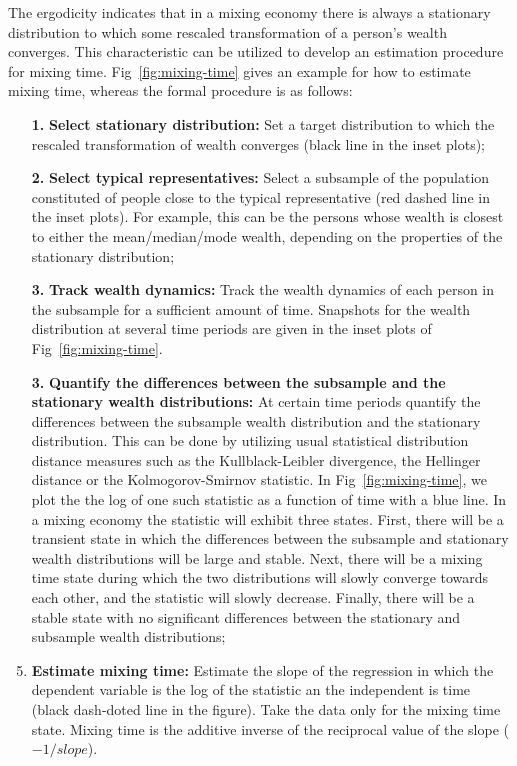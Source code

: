 \documentclass[11pt]{article}
\numberwithin{equation}{section}
\begin{document}
The ergodicity indicates that in a mixing economy there is always a stationary distribution to which some rescaled transformation of a person's wealth converges. This characteristic can be utilized to develop an estimation procedure for mixing time. Fig~\ref{fig:mixing-time} gives an example for how to estimate mixing time, whereas the formal procedure is as follows:
\begin{enumerate}
    \item[\textbf{1.}] \textbf{Select stationary distribution:} Set a target distribution to which the rescaled transformation of wealth converges (black line in the inset plots);
    \item[\textbf{2.}] \textbf{Select typical representatives:} Select a subsample of the population constituted of people close to the typical representative (red dashed line in the inset plots). For example, this can be the persons whose wealth is closest to either the mean/median/mode wealth, depending on the properties of the stationary distribution;
    \item[\textbf{3.}] \textbf{Track wealth dynamics:} Track the wealth dynamics of each person in the subsample for a sufficient amount of time. Snapshots for the wealth distribution at several time periods are given in the inset plots of Fig~\ref{fig:mixing-time}.
    \item[\textbf{3.}] \textbf{Quantify the differences between the subsample and the stationary wealth distributions:} At certain time periods quantify the differences between the subsample wealth distribution and the stationary distribution. This can be done by utilizing usual statistical distribution distance measures such as the Kullblack-Leibler divergence, the Hellinger distance or the Kolmogorov-Smirnov statistic. In Fig~\ref{fig:mixing-time}, we plot the the log of one such statistic as a function of time with a blue line. In a mixing economy the statistic will exhibit three states. First, there will be a transient state in which the differences between the subsample and stationary wealth distributions will be large and stable. Next, there will be a mixing time state during which the two distributions will slowly converge towards each other, and the statistic will slowly decrease. Finally, there will be a stable state with no significant differences between the stationary and subsample wealth distributions; 
    \item \textbf{Estimate mixing time:} Estimate the slope of the regression in which the dependent variable is the log of the statistic an the independent is time (black dash-doted line in the figure). Take the data only for the mixing time state. Mixing time is the additive inverse of the reciprocal value of the slope ($-1 / slope$).
\end{enumerate}
\end{document}
